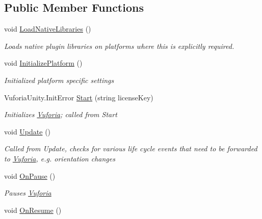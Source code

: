 \subsection*{Public Member Functions}
\begin{DoxyCompactItemize}
\item 
void \hyperlink{class_vuforia_1_1_android_unity_player_a9bf241f8dea29011eb506948e01642df_a9bf241f8dea29011eb506948e01642df}{Load\+Native\+Libraries} ()
\begin{DoxyCompactList}\small\item\em Loads native plugin libraries on platforms where this is explicitly required. \end{DoxyCompactList}\item 
void \hyperlink{class_vuforia_1_1_android_unity_player_aa53b76bee50aa20b2359fbf91f46ed84_aa53b76bee50aa20b2359fbf91f46ed84}{Initialize\+Platform} ()
\begin{DoxyCompactList}\small\item\em Initialized platform specific settings \end{DoxyCompactList}\item 
Vuforia\+Unity.\+Init\+Error \hyperlink{class_vuforia_1_1_android_unity_player_adf4dc708bc16b9d805caa998f6dea721_adf4dc708bc16b9d805caa998f6dea721}{Start} (string license\+Key)
\begin{DoxyCompactList}\small\item\em Initializes \hyperlink{namespace_vuforia}{Vuforia}; called from Start \end{DoxyCompactList}\item 
void \hyperlink{class_vuforia_1_1_android_unity_player_a4b854774c0f3b218ce90e537c0c88391_a4b854774c0f3b218ce90e537c0c88391}{Update} ()
\begin{DoxyCompactList}\small\item\em Called from Update, checks for various life cycle events that need to be forwarded to \hyperlink{namespace_vuforia}{Vuforia}, e.\+g. orientation changes \end{DoxyCompactList}\item 
void \hyperlink{class_vuforia_1_1_android_unity_player_a8a1fc8237562c30164d76062ba1d5c8c_a8a1fc8237562c30164d76062ba1d5c8c}{On\+Pause} ()
\begin{DoxyCompactList}\small\item\em Pauses \hyperlink{namespace_vuforia}{Vuforia} \end{DoxyCompactList}\item 
void \hyperlink{class_vuforia_1_1_android_unity_player_a7d7049ac5e3deb01f9bc3cd912614355_a7d7049ac5e3deb01f9bc3cd912614355}{On\+Resume} ()

\end{DoxyCompactItemize}
